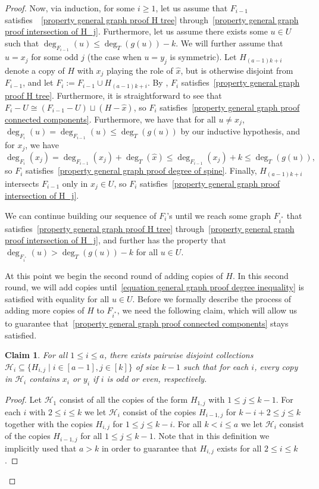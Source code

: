 \documentclass[12pt,letterpaper]{article}
\newtheorem{claim}[theorem]{Claim}
\theoremstyle{definition}
\renewcommand{\c}[1]{\mathcal{#1}}
\newcommand{\sub}{\subseteq}
\begin{document}
\begin{proof}
		Now, via induction, for some $i\geq 1$, let us assume that $F_{i-1}$ satisfies~~\ref{property general graph proof H tree} through~\ref{property general graph proof intersection of H_j}. Furthermore, let us assume there exists some $u\in U$ such that $\deg_{F_{i-1}}(u)\leq \deg_T(g(u))-k$. We will further assume that $u=x_j$ for some odd $j$ (the case when $u=y_j$ is symmetric). Let $H_{(a-1)k+i}$ denote a copy of $H$ with $x_j$ playing the role of $\hat{x}$, but is otherwise disjoint from $F_{i-1}$, and let $F_i:=F_{i-1}\cup H_{(a-1)k+i}$. By , $F_i$ satisfies~\ref{property general graph proof H tree}. Furthermore, it is straightforward to see that $F_i-U\cong (F_{i-1}-U)\sqcup (H-\hat{x})$, so $F_i$ satisfies~\ref{property general graph proof connected components}. Furthermore, we have that for all $u\neq x_j$, $\deg_{F_i}(u)=\deg_{F_{i-1}}(u)\le\deg_{T}(g(u))$ by our inductive hypothesis, and for $x_j$, we have \[\deg_{F_i}(x_j)=\deg_{F_{i-1}}(x_j)+\deg_T(\hat{x})\leq \deg_{F_{i-1}}(x_j)+k\leq \deg_T(g(u)),\] so $F_i$ satisfies~\ref{property general graph proof degree of spine}. Finally, $H_{(a-1)k+i}$ intersects $F_{i-1}$ only in $x_j\in U$, so $F_i$ satisfies~\ref{property general graph proof intersection of H_j}.
		
		We can continue building our sequence of $F_i$'s until we reach some graph $F_{i^*}$ that satisfies~\ref{property general graph proof H tree} through~\ref{property general graph proof intersection of H_j}, and further has the property that $\deg_{F_{i^*}}(u)>\deg_T(g(u))-k$ for all $u\in U$. 
		
		At this point we begin the second round of adding copies of $H$. In this second round, we will add copies until~\eqref{equation general graph proof degree inequality} is satisfied with equality for all $u\in U$. Before we formally describe the process of adding more copies of $H$ to $F_{i^*}$, we need the following claim, which will allow us to guarantee that~\ref{property general graph proof connected components} stays satisfied.
		
		\begin{claim}\label{claim general edge proof we have disjoint collections}
			For all $1\le i\le a$, there exists pairwise disjoint collections $\c{H}_i\sub \{H_{i,j}\mid i\in [a-1],j\in [k]\}$ of size $k-1$ such that for each $i$, every copy in $\c{H}_i$ contains $x_i$ or $y_i$ if $i$ is odd or even, respectively.
		\end{claim}
		
		\begin{proof}
			Let $\c{H}_1$ consist of all the copies of the form $H_{1,j}$ with $1\le j\le k-1$.  For each $i$ with $2\le i \le k$ we let $\c{H}_i$ consist of the copies $H_{i-1,j}$ for $k-i+2\le j\le k$ together with the copies $H_{i,j}$ for $1\le j\le k-i$.  For all $k<i\le a$ we let $\c{H}_i$ consist of the copies $H_{i-1,j}$ for all $1\le j\le k-1$.  Note that in this definition we implicitly used that $a>k$ in order to guarantee that $H_{i,j}$ exists for all $2\le i\le k$.
			

\end{proof}
\end{proof}
\end{document}
